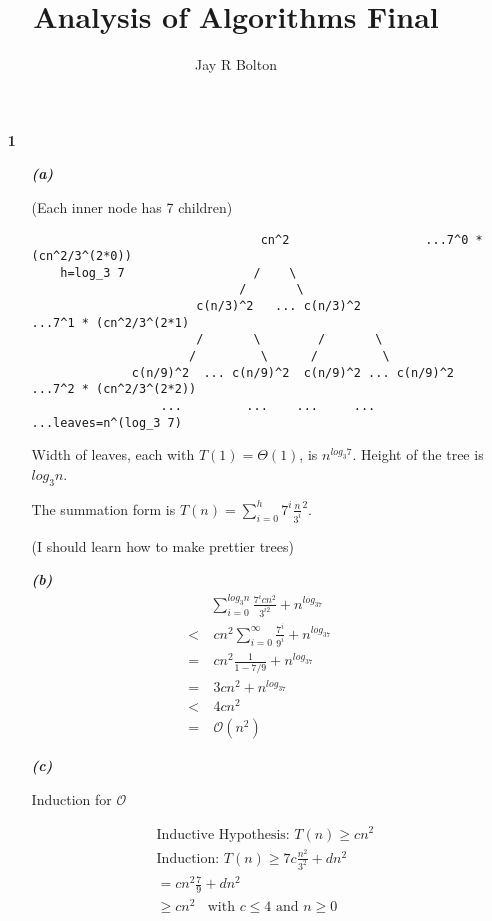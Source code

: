 \documentclass{article}
\title{Analysis of Algorithms Final}
\author{Jay R Bolton}
\begin{document}
\maketitle

\begin{enumerate}

\item[\textbf{1}]

	\begin{enumerate}
		\item[\textbf{\emph{(a)}}]

		(Each inner node has 7 children)

    \begin{verbatim}
                                cn^2                   ...7^0 * (cn^2/3^(2*0))
    h=log_3 7                  /    \
                             /       \
                       c(n/3)^2   ... c(n/3)^2             ...7^1 * (cn^2/3^(2*1)
                       /       \        /       \
                      /         \      /         \
              c(n/9)^2  ... c(n/9)^2  c(n/9)^2 ... c(n/9)^2     ...7^2 * (cn^2/3^(2*2))
                  ...         ...    ...     ...       ...leaves=n^(log_3 7)
		\end{verbatim}

		Width of leaves, each with $T(1) = \Theta(1)$, is $n^{log_{3}7}$. Height
		of the tree is $log_3 n$.

		The summation form is $T(n) = \sum_{i=0}^{h} 7^i \frac{n}{3^i}^2$.

		(I should learn how to make prettier trees)

		\item[\textbf{\emph{(b)}}]
			\begin{align*}
				& \sum_{i=0}^{log_3n} \frac{7^icn^2}{3^{i2}} + n^{log_37} \\
				<&\ cn^2 \sum_{i=0}^{\infty} \frac{7^i}{9^{i}} + n^{log_37} \\
				=&\ cn^2 \frac{1}{1 - 7/9} + n^{log_37} \\
				=&\ 3cn^2 + n^{log_37} \\
				<&\ 4cn^2 \\
				=&\ \mathcal{O}(n^2)
			\end{align*}

		\item[\textbf{\emph{(c)}}]

			Induction for $\mathcal{O}$

			\begin{align*}
			& \text{Inductive Hypothesis: } T(n) \geq cn^2\\
			& \text{Induction: } T(n) \geq 7c\frac{n^2}{3^2} + dn^2 \\
			& = cn^2 \frac{7}{9} + dn^2 \\
			& \geq cn^2 \ \ \ \ \text{with $c \leq 4$ and $n \geq 0$}
			\end{align*}


\end{enumerate}
\end{enumerate}
\end{document}
